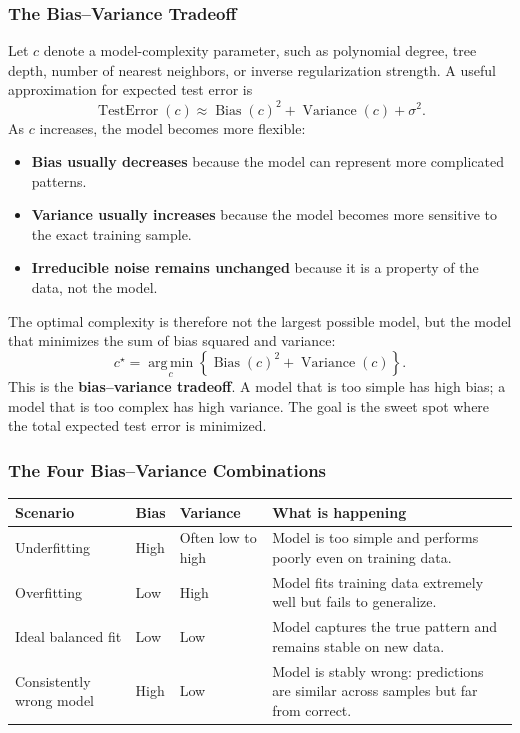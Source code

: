 \documentclass[12pt,openany]{book}
\begin{document}
\subsubsection{The Bias--Variance Tradeoff}

Let \(c\) denote a model-complexity parameter, such as polynomial degree, tree depth, number of nearest neighbors, or inverse regularization strength. A useful approximation for expected test error is
\begin{equation*}
    \operatorname{TestError}(c)
    \approx
    \operatorname{Bias}(c)^2
    + \operatorname{Variance}(c)
    + \sigma^2.
\end{equation*}
As \(c\) increases, the model becomes more flexible:
\begin{itemize}[leftmargin=*]
    \item \textbf{Bias usually decreases} because the model can represent more complicated patterns.
    \item \textbf{Variance usually increases} because the model becomes more sensitive to the exact training sample.
    \item \textbf{Irreducible noise remains unchanged} because it is a property of the data, not the model.
\end{itemize}

The optimal complexity is therefore not the largest possible model, but the model that minimizes the sum of bias squared and variance:
\begin{equation*}
    c^{\star}
    = \operatorname*{arg\,min}_{c}
    \left\{\operatorname{Bias}(c)^2 + \operatorname{Variance}(c)\right\}.
\end{equation*}
This is the \textbf{bias--variance tradeoff}. A model that is too simple has high bias; a model that is too complex has high variance. The goal is the sweet spot where the total expected test error is minimized.

\subsubsection{The Four Bias--Variance Combinations}

\begin{center}
\begin{tabular}{|L{0.18\textwidth}|L{0.14\textwidth}|L{0.14\textwidth}|L{0.34\textwidth}|}
\hline
\textbf{Scenario} & \textbf{Bias} & \textbf{Variance} & \textbf{What is happening} \\
\hline
Underfitting & High & Often low to high & Model is too simple and performs poorly even on training data. \\
\hline
Overfitting & Low & High & Model fits training data extremely well but fails to generalize. \\
\hline
Ideal balanced fit & Low & Low & Model captures the true pattern and remains stable on new data. \\
\hline
Consistently wrong model & High & Low & Model is stably wrong: predictions are similar across samples but far from correct. \\
\hline
\end{tabular}
\end{center}
\end{document}
